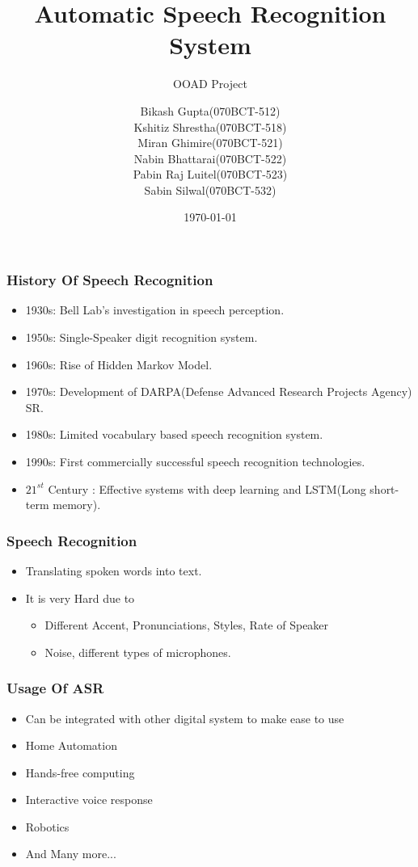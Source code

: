 \documentclass[11pt]{beamer}
\title{Automatic Speech Recognition System}
\subtitle{OOAD Project}
\author{
  Bikash Gupta(070BCT-512)\\
  Kshitiz Shrestha(070BCT-518)\\
  Miran Ghimire(070BCT-521)\\
  Nabin Bhattarai(070BCT-522)\\
  Pabin Raj Luitel(070BCT-523)\\
  Sabin Silwal(070BCT-532)
}
\institute{IOE, Central Campus Pulchowk}
\date{\today}
\begin{document}
\begin{frame}
\titlepage
\end{frame}

\begin{frame}
  \centering
  \frametitle{History Of Speech Recognition}
  \begin{itemize}
  \item 1930s: Bell Lab's investigation in speech perception.
    \pause
  \item 1950s: Single-Speaker digit recognition system.
    \pause
  \item 1960s: Rise of Hidden Markov Model.
    \pause
  \item 1970s: Development of DARPA(Defense Advanced Research Projects Agency) SR.
    \pause
  \item 1980s: Limited vocabulary based speech recognition system.
    \pause
  \item 1990s: First commercially successful speech recognition technologies.
    \pause
  \item $21^{st}$ Century : Effective systems with deep learning and LSTM(Long short-term memory).
  \end{itemize}
\end{frame}

\begin{frame}
  \centering
  \frametitle{Speech Recognition}
  \begin{itemize}
    \pause
  \item Translating spoken words into text.
    \pause
  \item It is very Hard due to
    \pause
    \begin{itemize}
    \item Different Accent, Pronunciations, Styles, Rate of Speaker
      \pause
    \item Noise, different types of microphones.
    \end{itemize}
  \end{itemize}
\end{frame}

\begin{frame}
  \centering
  \frametitle{Usage Of ASR}
  \begin{itemize}
  \item Can be integrated with other digital system to make ease to use
    \pause
  \item Home Automation
    \pause
  \item Hands-free computing
    \pause
  \item Interactive voice response
    \pause
  \item Robotics
    \pause
  \item And Many more...
  \end{itemize}
\end{frame}
\end{document}
